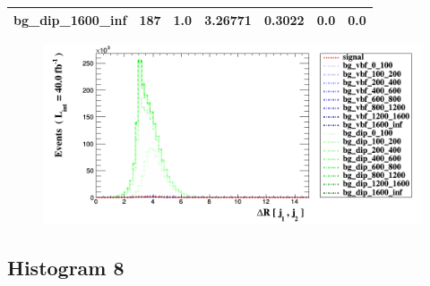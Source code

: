\documentclass[a4paper, 10pt]{article}
\begin{document}
\begin{table}[H]
\begin{center}
\begin{tabular}{|m{23.0mm}|m{23.0mm}|m{18.0mm}|m{19.0mm}|m{19.0mm}|m{19.0mm}|m{19.0mm}|}
      \hline
      {\cellcolor{white}         bg\_dip\_1600\_inf}& {\cellcolor{white}         187}& {\cellcolor{white}         1.0}& {\cellcolor{white}         3.26771}& {\cellcolor{white}         0.3022}& {\cellcolor{green}         0.0}& {\cellcolor{green}         0.0}\\
\hline
    \end{tabular}
  \end{center}
\end{table}

\begin{figure}[H]
  \begin{center}
    \includegraphics[scale=0.45]{selection_6.png}\\
\caption{   }
  \end{center}
\end{figure}
      \newpage
\subsection{ Histogram 8}
\end{document}
